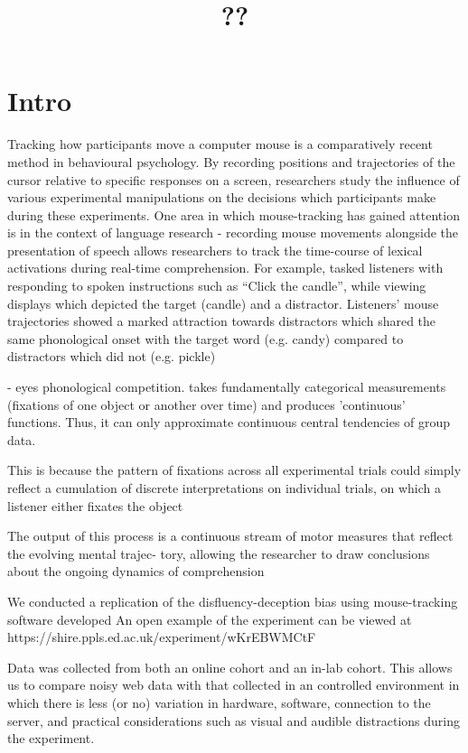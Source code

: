 \documentclass[a4paper,man,natbib]{apa6}
\title{??}
\author{}
\affiliation{}
\newcommand*{\spex}[1]{``{#1}''} %
\begin{document}
\maketitle
\linenumbers
\noindent


\section*{Intro}
Tracking how participants move a computer mouse is a comparatively recent method in behavioural psychology. 
By recording positions and trajectories of the cursor relative to specific responses on a screen, researchers study the influence of various experimental manipulations on the decisions which participants make during these experiments.
One area in which mouse-tracking has gained attention is in the context of language research - recording mouse movements alongside the presentation of speech allows researchers to track the time-course of lexical activations during real-time comprehension.
For example, \citet{Spivey?} tasked listeners with responding to spoken instructions such as \spex{Click the candle}, while viewing displays which depicted the target (candle) and a distractor. 
Listeners’ mouse trajectories showed a marked attraction towards distractors which shared the same phonological onset with the target word (e.g. candy) compared to distractors which did not (e.g. pickle)

\citet{Allopenna1998} - eyes phonological competition. 
takes fundamentally categorical measurements (fixations of one object or another over time) and produces 'continuous' functions. Thus, it can only approximate continuous central tendencies of group data.

This is because the pattern of fixations across all experimental trials
could simply reflect a cumulation of discrete interpretations on individual trials,
on which a listener either fixates the object
\citep{Farmer2005}

The output of this process is
a continuous stream of motor measures that reflect the evolving mental trajec-
tory, allowing the researcher to draw conclusions about the ongoing dynamics of
comprehension


We conducted a replication of the disfluency-deception bias \citep[see]{Loy2017} using mouse-tracking software developed %
An open example of the experiment can be viewed at https://shire.ppls.ed.ac.uk/experiment/wKrEBWMCtF

Data was collected from both an online cohort and an in-lab cohort. 
This allows us to compare noisy web data with that collected in an controlled environment in which there is less (or no) variation in hardware, software, connection to the server, and practical considerations such as visual and audible distractions during the experiment.
\end{document}
